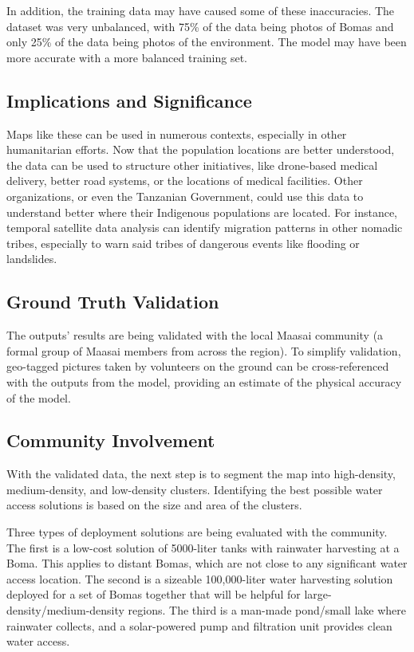 \documentclass[10pt]{article}
\begin{document}
In addition, the training data may have caused some of these inaccuracies. The dataset was very unbalanced, with 75\% of the data being photos of Bomas and only 25\% of the data being photos of the environment. The model may have been more accurate with a more balanced training set.

\subsection{Implications and Significance}

Maps like these can be used in numerous contexts, especially in other humanitarian efforts. Now that the population locations are better understood, the data can be used to structure other initiatives, like drone-based medical delivery, better road systems, or the locations of medical facilities. Other organizations, or even the Tanzanian Government, could use this data to understand better where their Indigenous populations are located. For instance, temporal satellite data analysis can identify migration patterns in other nomadic tribes, especially to warn said tribes of dangerous events like flooding or landslides.

\subsection{Ground Truth Validation}

The outputs' results are being validated with the local Maasai community (a formal group of Maasai members from across the region). To simplify validation, geo-tagged pictures taken by volunteers on the ground can be cross-referenced with the outputs from the model, providing an estimate of the physical accuracy of the model.

\subsection{Community Involvement}

With the validated data, the next step is to segment the map into high-density, medium-density, and low-density clusters. Identifying the best possible water access solutions is based on the size and area of the clusters.

Three types of deployment solutions are being evaluated with the community. The first is a low-cost solution of 5000-liter tanks with rainwater harvesting at a Boma. This applies to distant Bomas, which are not close to any significant water access location. The second is a sizeable 100,000-liter water harvesting solution deployed for a set of Bomas together that will be helpful for large-density/medium-density regions. The third is a man-made pond/small lake where rainwater collects, and a solar-powered pump and filtration unit provides clean water access.
\end{document}
